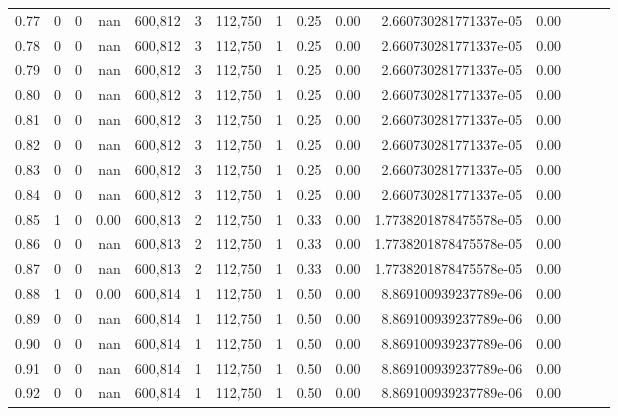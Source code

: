 \begin{tabular}{rrrrrrrrrrrrrrr}
0.77 &       0 &      0 &   nan &  600,812 &        3 &  112,750 &        1 &  0.25 &  0.00 &   2.660730281771337e-05 &      0.00 \\
0.78 &       0 &      0 &   nan &  600,812 &        3 &  112,750 &        1 &  0.25 &  0.00 &   2.660730281771337e-05 &      0.00 \\
0.79 &       0 &      0 &   nan &  600,812 &        3 &  112,750 &        1 &  0.25 &  0.00 &   2.660730281771337e-05 &      0.00 \\
0.80 &       0 &      0 &   nan &  600,812 &        3 &  112,750 &        1 &  0.25 &  0.00 &   2.660730281771337e-05 &      0.00 \\
0.81 &       0 &      0 &   nan &  600,812 &        3 &  112,750 &        1 &  0.25 &  0.00 &   2.660730281771337e-05 &      0.00 \\
0.82 &       0 &      0 &   nan &  600,812 &        3 &  112,750 &        1 &  0.25 &  0.00 &   2.660730281771337e-05 &      0.00 \\
0.83 &       0 &      0 &   nan &  600,812 &        3 &  112,750 &        1 &  0.25 &  0.00 &   2.660730281771337e-05 &      0.00 \\
0.84 &       0 &      0 &   nan &  600,812 &        3 &  112,750 &        1 &  0.25 &  0.00 &   2.660730281771337e-05 &      0.00 \\
0.85 &       1 &      0 &  0.00 &  600,813 &        2 &  112,750 &        1 &  0.33 &  0.00 &  1.7738201878475578e-05 &      0.00 \\
0.86 &       0 &      0 &   nan &  600,813 &        2 &  112,750 &        1 &  0.33 &  0.00 &  1.7738201878475578e-05 &      0.00 \\
0.87 &       0 &      0 &   nan &  600,813 &        2 &  112,750 &        1 &  0.33 &  0.00 &  1.7738201878475578e-05 &      0.00 \\
0.88 &       1 &      0 &  0.00 &  600,814 &        1 &  112,750 &        1 &  0.50 &  0.00 &   8.869100939237789e-06 &      0.00 \\
0.89 &       0 &      0 &   nan &  600,814 &        1 &  112,750 &        1 &  0.50 &  0.00 &   8.869100939237789e-06 &      0.00 \\
0.90 &       0 &      0 &   nan &  600,814 &        1 &  112,750 &        1 &  0.50 &  0.00 &   8.869100939237789e-06 &      0.00 \\
0.91 &       0 &      0 &   nan &  600,814 &        1 &  112,750 &        1 &  0.50 &  0.00 &   8.869100939237789e-06 &      0.00 \\
0.92 &       0 &      0 &   nan &  600,814 &        1 &  112,750 &        1 &  0.50 &  0.00 &   8.869100939237789e-06 &      0.00 \\

\end{tabular}
